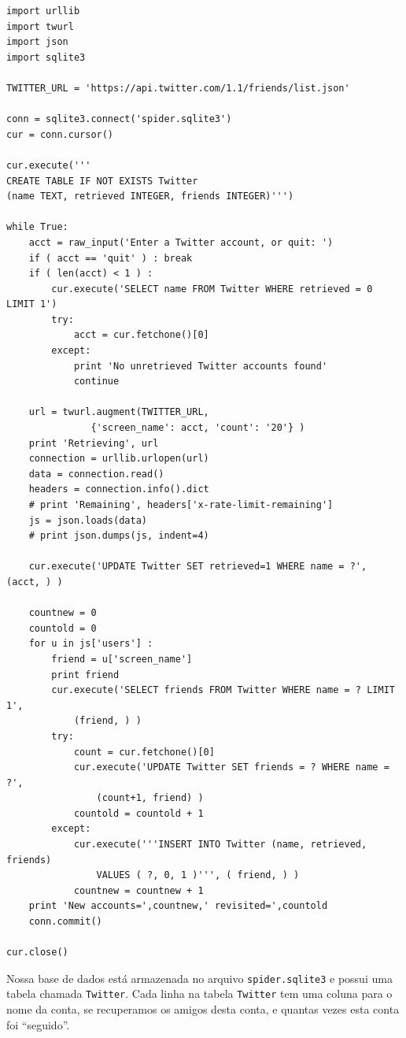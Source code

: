 \beforeverb
\begin{verbatim}
import urllib
import twurl
import json
import sqlite3

TWITTER_URL = 'https://api.twitter.com/1.1/friends/list.json'

conn = sqlite3.connect('spider.sqlite3')
cur = conn.cursor()

cur.execute('''
CREATE TABLE IF NOT EXISTS Twitter 
(name TEXT, retrieved INTEGER, friends INTEGER)''')

while True:
    acct = raw_input('Enter a Twitter account, or quit: ')
    if ( acct == 'quit' ) : break
    if ( len(acct) < 1 ) :
        cur.execute('SELECT name FROM Twitter WHERE retrieved = 0 LIMIT 1')
        try:
            acct = cur.fetchone()[0]
        except:
            print 'No unretrieved Twitter accounts found'
            continue

    url = twurl.augment(TWITTER_URL, 
               {'screen_name': acct, 'count': '20'} )
    print 'Retrieving', url
    connection = urllib.urlopen(url)
    data = connection.read()
    headers = connection.info().dict
    # print 'Remaining', headers['x-rate-limit-remaining']
    js = json.loads(data)
    # print json.dumps(js, indent=4)

    cur.execute('UPDATE Twitter SET retrieved=1 WHERE name = ?', (acct, ) )

    countnew = 0
    countold = 0
    for u in js['users'] :
        friend = u['screen_name']
        print friend
        cur.execute('SELECT friends FROM Twitter WHERE name = ? LIMIT 1', 
            (friend, ) )
        try:
            count = cur.fetchone()[0]
            cur.execute('UPDATE Twitter SET friends = ? WHERE name = ?', 
                (count+1, friend) )
            countold = countold + 1
        except:
            cur.execute('''INSERT INTO Twitter (name, retrieved, friends) 
                VALUES ( ?, 0, 1 )''', ( friend, ) )
            countnew = countnew + 1
    print 'New accounts=',countnew,' revisited=',countold
    conn.commit()

cur.close()
\end{verbatim}
\afterverb
%

%
Nossa base de dados está armazenada no arquivo {\tt spider.sqlite3} e possui
uma tabela chamada {\tt Twitter}. Cada linha na tabela {\tt Twitter} tem uma
coluna para o nome da conta, se recuperamos os amigos desta conta, e quantas
vezes esta conta foi ``seguido''.

